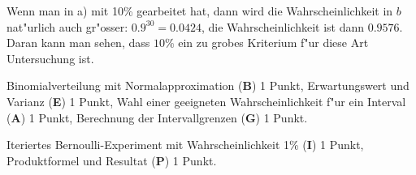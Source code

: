 \begin{loesung}
\begin{teilaufgaben}
Wenn man in a) mit 10\% gearbeitet hat, dann wird die Wahrscheinlichkeit in
$b$ nat"urlich auch gr"osser: $0.9^{30}=0.0424$, die Wahrscheinlichkeit ist
dann $0.9576$. Daran kann man sehen, dass $10\%$ ein zu grobes Kriterium
f"ur diese Art Untersuchung ist.
\qedhere
\end{teilaufgaben}
\end{loesung}

\begin{bewertung}
\begin{teilaufgaben}
\item Binomialverteilung mit Normalapproximation ({\bf B}) 1 Punkt,
Erwartungswert und Varianz ({\bf E}) 1 Punkt,
Wahl einer geeigneten Wahrscheinlichkeit f"ur ein Interval ({\bf A}) 1 Punkt,
Berechnung der Intervallgrenzen ({\bf G}) 1 Punkt.
\item Iteriertes Bernoulli-Experiment mit Wahrscheinlichkeit 1\% ({\bf I})
1 Punkt,
Produktformel und Resultat ({\bf P}) 1 Punkt.
\end{teilaufgaben}
\end{bewertung}


